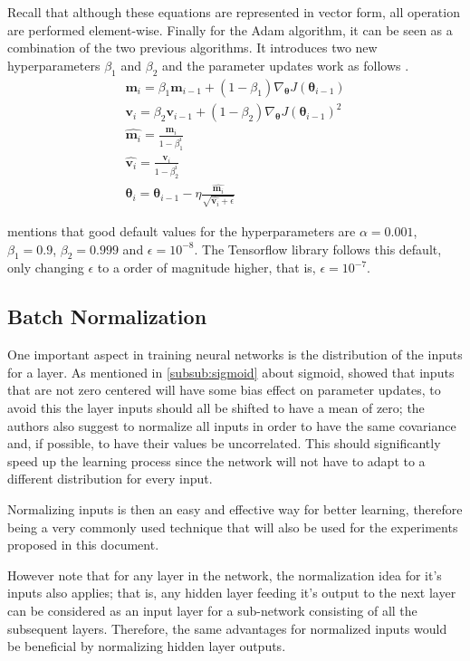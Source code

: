 Recall that although these equations are represented in vector form, all operation are performed element-wise. Finally for the \gls{Adam} algorithm, it can be seen as a combination of the two previous algorithms. It introduces two new hyperparameters $\beta_1$ and $\beta_2$ and the parameter updates work as follows \cite{adam2017}.
\begin{gather}
    \bm{m}_i = \beta_1 \bm{m}_{i-1} + (1 - \beta_1) \nabla_{\bm{\theta}} J(\bm{\theta}_{i-1}) \\[5pt]
    \bm{v}_i = \beta_2 \bm{v}_{i-1} + (1 - \beta_2) \nabla_{\bm{\theta}} J(\bm{\theta}_{i-1})^2 \\[5pt]
    \hat{\bm{m}_i} = \frac{\bm{m}_i}{1 - \beta_1^i} \\[5pt]
    \hat{\bm{v}_i} = \frac{\bm{v}_i}{1 - \beta_2^i} \\[5pt]
    \bm{\theta}_i = \bm{\theta}_{i-1} - \eta \frac{\hat{\bm{m}_i}}{\sqrt{\hat{\bm{v}_i} + \epsilon}}
\end{gather}

\textcite{adam2017} mentions that good default values for the hyperparameters are $\alpha = 0.001$, $\beta_1 = 0.9$, $\beta_2 = 0.999$ and $\epsilon = 10^{-8}$. The Tensorflow library \cite{tensorflow2015} follows this default, only changing $\epsilon$ to a order of magnitude higher, that is, $\epsilon = 10^{-7}$.

\subsection{Batch Normalization}
One important aspect in training neural networks is the distribution of the inputs for a layer. As mentioned in \autoref{subsub:sigmoid} about sigmoid, \textcite{efficientBackprop2012} showed that inputs that are not zero centered will have some bias effect on parameter updates, to avoid this the layer inputs should all be shifted to have a mean of zero; the authors also suggest to normalize all inputs in order to have the same covariance and, if possible, to have their values be uncorrelated. This should significantly speed up the learning process since the network will not have to adapt to a different distribution for every input.

Normalizing inputs is then an easy and effective way for better learning, therefore being a very commonly used technique that will also be used for the experiments proposed in this document.

However \textcite{batchnorm2015} note that for any layer in the network, the normalization idea for it's inputs also applies; that is, any hidden layer feeding it's output to the next layer can be considered as an input layer for a sub-network consisting of all the subsequent layers. Therefore, the same advantages for normalized inputs would be beneficial by normalizing hidden layer outputs.

